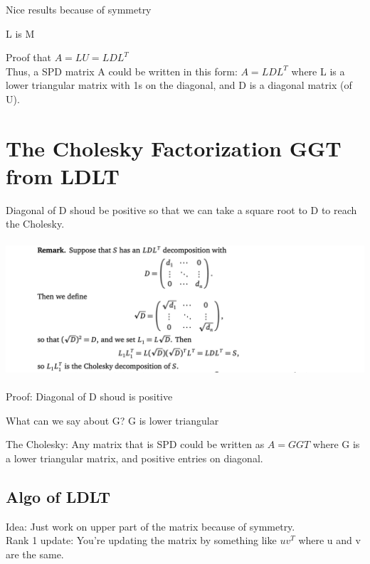 \documentclass{article}
\begin{document}
\noindent
Nice results because of symmetry

L is M

\noindent
Proof that $A = LU = LDL^T$\\

\noindent
Thus, a SPD matrix A could be written in this form: $A = LDL^T$
where L is a lower triangular matrix with 1s on the diagonal, and D is a diagonal matrix (of U).\\



\pagebreak
\section{The Cholesky Factorization GGT from LDLT}
Diagonal of D shoud be positive so that we can take a square root to D to reach the Cholesky.\\
\\
\includegraphics[width=1.5\linewidth]{lec6-3.png}\\
\\
\medskip
Proof: Diagonal of D shoud is positive


What can we say about G?
G is lower triangular

\noindent
The Cholesky: Any matrix that is SPD could be written as $A = GGT$ where G is a lower triangular matrix, and positive
entries on diagonal.\\

\subsection*{Algo of LDLT}
Idea: Just work on upper part of the matrix because of symmetry.\\

\noindent
Rank 1 update: You're updating the matrix by something like $uv^T$ where u and v are the same.\\
\end{document}
